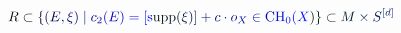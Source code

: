 \documentclass[12pt]{article}
\begin{document}
\makeatletter
\renewcommand*{\@textcolor}[3]{%
  \protect\leavevmode
  \begingroup
    \color#1{#2}#3%
  \endgroup
}
\makeatother
\begin{displaymath}
\mathcolor[RGB]{0,0,15}{R} \mathcolor[RGB]{0,0,30}{\subset} \mathcolor[RGB]{0,0,45}{\{} \mathcolor[RGB]{0,0,60}{(} \mathcolor[RGB]{0,0,75}{E} \mathcolor[RGB]{0,0,90}{,} \mathcolor[RGB]{0,0,105}{\xi} \mathcolor[RGB]{0,0,120}{)} \mathcolor[RGB]{0,0,135}{\mid} \mathcolor[RGB]{0,0,150}{c} _ { \mathcolor[RGB]{0,0,165}{2} } \mathcolor[RGB]{0,0,180}{(} \mathcolor[RGB]{0,0,195}{E} \mathcolor[RGB]{0,0,210}{)} \mathcolor[RGB]{0,0,225}{=} \mathcolor[RGB]{0,0,240}{[} \mathrm { \mathcolor[RGB]{0,0,255}{s} \mathcolor[RGB]{0,15,0}{u} \mathcolor[RGB]{0,15,15}{p} \mathcolor[RGB]{0,15,30}{p} } \mathcolor[RGB]{0,15,45}{(} \mathcolor[RGB]{0,15,60}{\xi} \mathcolor[RGB]{0,15,75}{)} \mathcolor[RGB]{0,15,90}{]} \mathcolor[RGB]{0,15,105}{+} \mathcolor[RGB]{0,15,120}{c} \mathcolor[RGB]{0,15,135}{\cdot} \mathcolor[RGB]{0,15,150}{o} _ { \mathcolor[RGB]{0,15,165}{X} } \mathcolor[RGB]{0,15,180}{\in} \mathrm { \mathcolor[RGB]{0,15,195}{C} \mathcolor[RGB]{0,15,210}{H} } _ { \mathcolor[RGB]{0,15,225}{0} } \mathcolor[RGB]{0,15,240}{(} \mathcolor[RGB]{0,15,255}{X} \mathcolor[RGB]{0,30,0}{)} \mathcolor[RGB]{0,30,15}{\}} \mathcolor[RGB]{0,30,30}{\subset} \mathcolor[RGB]{0,30,45}{M} \mathcolor[RGB]{0,30,60}{\times} \mathcolor[RGB]{0,30,75}{S} ^ { \mathcolor[RGB]{0,30,90}{[} \mathcolor[RGB]{0,30,105}{d} \mathcolor[RGB]{0,30,120}{]} }
\end{displaymath}
\end{document}
